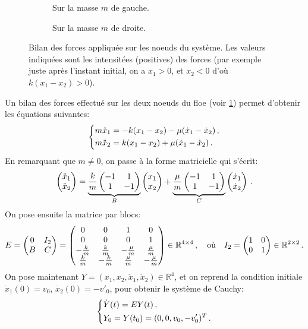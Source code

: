 \begin{figure}[!h]
    \begin{subfigure}[b]{0.33\textwidth}
        \centering
        \caption{Sur la masse $m$ de gauche.}
    \end{subfigure}
    \begin{subfigure}[b]{0.3\textwidth}
        \centering
        \caption{Sur la masse $m$ de droite.}
    \end{subfigure}
       \caption{Bilan des forces appliquée sur les noeuds du système. Les valeurs indiquées sont les intensitées (positives) des forces (par exemple juste après l'instant initial, on a $x_1 > 0$, et $x_2 < 0$ d'où $k(x_1-x_2) > 0$).}
       \label{fig:bilan0}
\end{figure}


\noindent Un bilan des forces effectué sur les deux noeuds du floe (voir \cref{fig:bilan0}) permet d'obtenir les équations suivantes:
\begin{align}
    \begin{dcases}
    m\ddot x_1 = - k(x_1 - x_2) - \mu(\dot x_1 - \dot x_2) \,,\\
        m \ddot x_2 =  k(x_1 - x_2) + \mu(\dot x_1 - \dot x_2) \,. 
    \end{dcases}
\end{align}
En remarquant que $m\neq 0$, on passe à la forme matricielle qui s'écrit:
\begin{align}
    \begin{pmatrix} \ddot{x}_1 \\ \ddot{x}_2 \end{pmatrix} = 
      \underbrace{ \frac{k}{m} \begin{pmatrix} -1 & 1 \\ 1 & -1 \end{pmatrix}}_{B} \begin{pmatrix} x_1 \\ x_2 \end{pmatrix}
    + \underbrace{\frac{\mu}{m} \begin{pmatrix} -1 & 1 \\ 1 & -1 \end{pmatrix}}_{C} \begin{pmatrix} \dot{x}_1 \\ \dot{x}_2 \end{pmatrix} \,.
\end{align}
On pose ensuite la matrice par blocs:
\[ E = \begin{pmatrix} 0 & I_2 \\ B & C \end{pmatrix}  =  \begin{pmatrix}
    0 & 0 & 1 & 0 \\ 0 & 0& 0& 1 \\ -\frac{k}{m} & \frac{k}{m} & -\frac{\mu}{m} & \frac{\mu}{m} \\ \frac{k}{m} & -\frac{k}{m} & \frac{\mu}{m} & -\frac{\mu}{m}
\end{pmatrix}   \in \mathbb{R}^{4\times 4} \,, \quad \text{où} \quad I_2 = \begin{pmatrix} 1 & 0 \\ 0 & 1 \end{pmatrix} \in \mathbb{R}^{2\times 2} \,. \]
On pose maintenant $Y = (x_1, x_2, \dot{x}_1, \dot{x}_2) \in \mathbb{R}^4$, et on reprend la condition initiale $\dot x_1(0) = v_0$, $\dot x_2(0) = -v'_0$, pour obtenir le système de Cauchy:
\begin{align} \label{eq:dep1d}
    \begin{dcases}
        \dot{Y}(t)= E Y(t) \,, \\
        Y_0 = Y(t_0) = (0,0,v_0,-v'_0)^T \,.
    \end{dcases}
\end{align}

